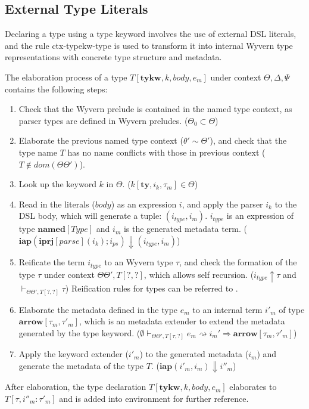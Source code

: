 \documentclass{sig-alternate}
\begin{document}
\subsection{External Type Literals}
Declaring a type using a type keyword involves the use of external DSL literals, and the rule ctx-typekw-type is used to transform it into internal Wyvern type representations with concrete type structure and metadata.

The elaboration process of a type $T[\mathbf{tykw},k,body,e_m]$ under context $\Theta,\Delta,\Psi$ contains the following steps:
\begin{enumerate}\setlength{\itemsep}{0pt}
\item Check that the Wyvern prelude is contained in the named type context, as parser types are defined in Wyvern preludes. ($\Theta_0\subset \Theta$)
\item Elaborate the previous named type context ($\theta'\sim\Theta'$), and check that the type name $T$ has no name conflicts with those in previous context ($T\notin dom(\Theta\Theta')$).
\item Look up the keyword $k$ in $\Theta$. ($k[\mathbf{ty},i_k,\tau_m]\in\Theta$)
\item Read in the literals ($body$) as an expression $i$, and apply the parser $i_k$ to the DSL body, which will generate a tuple: $(i_{type}, i_m)$. $i_{type}$ is an expression of type $\mathbf{named}[Type]$ and $i_m$ is the generated metadata term. ($\mathbf{iap}(\mathbf{iprj}[parse](i_k);i_{ps})\Downarrow(i_{type},i_{m})$)
\item Reificate the term $i_{type}$ to an Wyvern type $\tau$, and check the formation of the type $\tau$ under context $\Theta\Theta',T[?,?]$, which allows self recursion. ($i_{type}\uparrow\tau$ and $\vdash_{\Theta\Theta',T[?,?]}\tau$) Reification rules for types can be referred to .
\item Elaborate the metadata defined in the type $e_m$ to an internal term $i'_m$ of type $\mathbf{arrow}[\tau_m,\tau'_m]$, which is an metadata extender to extend the metadata generated by the type keyword. ($\emptyset\vdash_{\Theta\Theta',T[\tau,?]}e_m\rightsquigarrow i_m' \Rightarrow \mathbf{arrow}[\tau_m, \tau'_m]$)
\item Apply the keyword extender ($i'_m$) to the generated metadata ($i_m$) and generate the metadata of the type $T$. ($\mathbf{iap}(i'_m,i_m)\Downarrow i''_m$)  
\end{enumerate}
After elaboration, the type declaration $T[\mathbf{tykw},k,body,e_m]$ elaborates to $T[\tau,i''_m:\tau'_m]$ and is added into environment for further reference.
\end{document}
